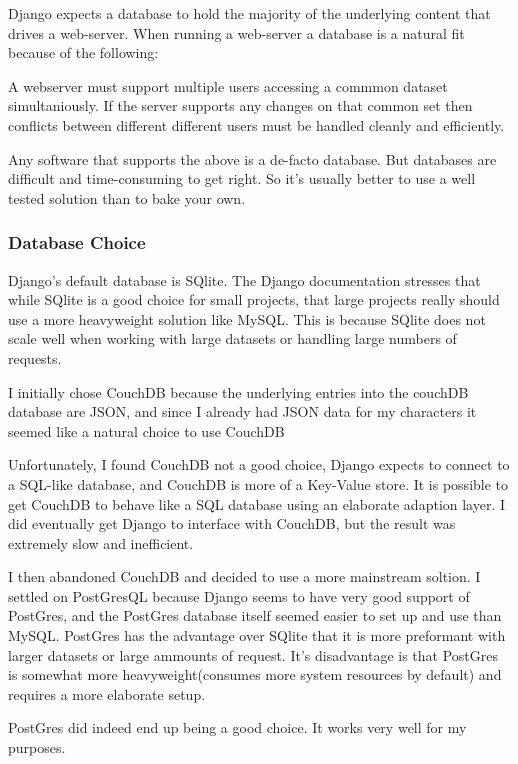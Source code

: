 Django expects a database to hold the majority of the underlying content that drives a web-server.  When running a web-server a database is a natural fit because of the following:

A webserver must support multiple users accessing a commmon dataset simultaniously.
If the server supports any changes on that common set then conflicts between different different users must be handled cleanly and efficiently.

Any software that supports the above is a de-facto database.  But databases are difficult and time-consuming to get right.  So it's usually better to use a well tested solution than to bake your own.

\subsubsection{Database Choice}

Django's default database is SQlite.  The Django documentation stresses that while SQlite is a good choice for small  projects, that large projects really should use a more heavyweight solution like MySQL.  This is because SQlite does not scale well when working with large datasets or handling large numbers of requests.

I initially chose CouchDB because the underlying entries into the couchDB database are JSON, and since I already had JSON data for my characters it seemed like a natural choice to use CouchDB

Unfortunately, I found CouchDB not a good choice, Django expects to connect to a SQL-like database, and CouchDB is more of a Key-Value store.  It is possible to get CouchDB to behave like a SQL database using an elaborate adaption layer.  I did eventually get Django to interface with CouchDB, but the result was extremely slow and inefficient.

I then abandoned CouchDB and decided to use a more mainstream soltion.  I settled on PostGresQL because Django seems to have very good support of PostGres, and the PostGres database itself seemed easier to set up and use than MySQL.  PostGres has the advantage over SQlite that it is more preformant with larger datasets or large ammounts of request.  It's disadvantage is that PostGres is somewhat more heavyweight(consumes more system resources by default) and requires a more elaborate setup.

PostGres did indeed end up being a good choice.  It works very well for my purposes.


